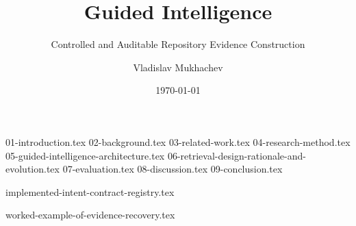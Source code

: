 \documentclass{mscthesis}
\title{Guided Intelligence}
\subtitle{Controlled and Auditable Repository Evidence Construction}
\date{\today}
\author{Vladislav Mukhachev}
\let\cleardoublepage\clearpage
\begin{document}
\frontmatter
\makecoverpage
\makeformaltitlepages

\tableofcontents{}
\listoftables{}
\listoffigures{}

\mainmatter
{01-introduction.tex}
{02-background.tex}
{03-related-work.tex}
{04-research-method.tex}
{05-guided-intelligence-architecture.tex}
{06-retrieval-design-rationale-and-evolution.tex}
{07-evaluation.tex}
{08-discussion.tex}
{09-conclusion.tex}

\appendix
{implemented-intent-contract-registry.tex}

{worked-example-of-evidence-recovery.tex}

\backmatter
\printbibliography{}
\cleardoublepage{}
\printacronyms[style=long,title={Acronyms}]
\cleardoublepage{}
\end{document}
